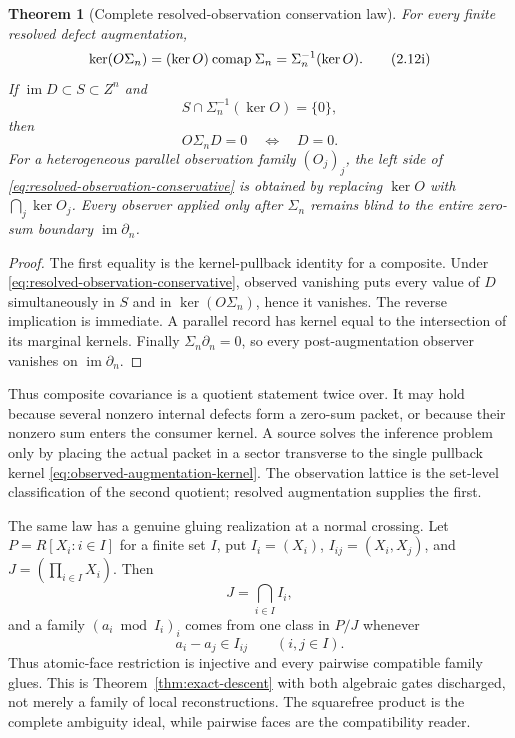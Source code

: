 \documentclass[11pt]{article}
\newtheorem{theorem}{Theorem}[section]
\theoremstyle{definition}
\theoremstyle{remark}
\newcommand{\im}{\operatorname{im}}
\begin{document}
\begin{theorem}[Complete resolved-observation conservation law]
\label{thm:resolved-observation}
For every finite resolved defect augmentation,
\[
 \ker(O\Sigma_n)=(\ker O)\mathbin{\mathop{\rm comap}}\Sigma_n
 =\Sigma_n^{-1}(\ker O).
\tag{2.12i}\label{eq:observed-augmentation-kernel}
\]
If \(\im D\subset S\subset Z^n\) and
\[
                       S\cap\Sigma_n^{-1}(\ker O)=\{0\},
\tag{2.12j}\label{eq:resolved-observation-conservative}
\]
then
\[
                         O\Sigma_nD=0\quad\Longleftrightarrow\quad D=0.
\tag{2.12k}\label{eq:resolved-observation-selection}
\]
For a heterogeneous parallel observation family \((O_j)_j\), the left side
of \eqref{eq:resolved-observation-conservative} is obtained by replacing
\(\ker O\) with \(\bigcap_j\ker O_j\).  Every observer applied only after
\(\Sigma_n\) remains blind to the entire zero-sum boundary
\(\im\partial_n\).
\end{theorem}

\begin{proof}
The first equality is the kernel-pullback identity for a composite.  Under
\eqref{eq:resolved-observation-conservative}, observed vanishing puts every
value of \(D\) simultaneously in \(S\) and in \(\ker(O\Sigma_n)\), hence it
vanishes.  The reverse implication is immediate.  A parallel record has
kernel equal to the intersection of its marginal kernels.  Finally
\(\Sigma_n\partial_n=0\), so every post-augmentation observer vanishes on
\(\im\partial_n\).
\end{proof}

Thus composite covariance is a quotient statement twice over.  It may hold
because several nonzero internal defects form a zero-sum packet, or because
their nonzero sum enters the consumer kernel.  A source solves the inference
problem only by placing the actual packet in a sector transverse to the
single pullback kernel \eqref{eq:observed-augmentation-kernel}.  The
observation lattice is the set-level classification of the second quotient;
resolved augmentation supplies the first.

The same law has a genuine gluing realization at a normal crossing.  Let
\(P=R[X_i:i\in I]\) for a finite set \(I\), put
\(I_i=(X_i)\), \(I_{ij}=(X_i,X_j)\), and
\(J=(\prod_{i\in I}X_i)\).  Then
\[
 J=\bigcap_{i\in I}I_i,
\tag{2.12g}\label{eq:face-uniqueness}
\]
and a family \((a_i\bmod I_i)_i\) comes from one class in \(P/J\) whenever
\[
                         a_i-a_j\in I_{ij}
                         \qquad(i,j\in I).
\tag{2.12h}\label{eq:face-compatibility}
\]
Thus atomic-face restriction is injective and every pairwise compatible
family glues.  This is Theorem~\ref{thm:exact-descent} with both algebraic
gates discharged, not merely a family of local reconstructions.  The
squarefree product is the complete ambiguity ideal, while pairwise faces
are the compatibility reader.
\end{document}
